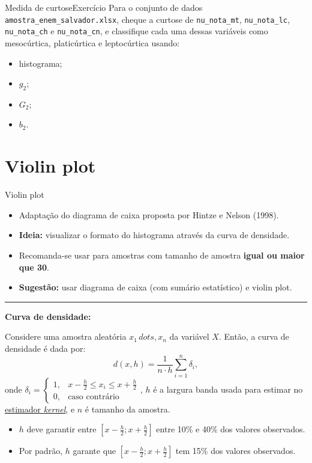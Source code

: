 \documentclass[
  10pt,
  ignorenonframetext,
]{beamer}
\providecommand{\tightlist}{%
  \setlength{\itemsep}{0pt}\setlength{\parskip}{0pt}}\usepackage{longtable,booktabs,array}
\newcommand*{\regrafina}{\rule{\textwidth}{0.5pt}}
\begin{document}
\begin{frame}[fragile]{Medida de curtose\newline Exercício}
\protect\hypertarget{medida-de-curtoseexercuxedcio}{}
Para o conjunto de dados \texttt{amostra\_enem\_salvador.xlsx}, cheque a
curtose de \texttt{nu\_nota\_mt}, \texttt{nu\_nota\_lc},
\texttt{nu\_nota\_ch} e \texttt{nu\_nota\_cn}, e classifique cada uma
dessas variáveis como mesocúrtica, platicúrtica e leptocúrtica usando:

\begin{itemize}
\tightlist
\item
  histograma;
\item
  \(g_2\);
\item
  \(G_2\);
\item
  \(b_2\).
\end{itemize}
\end{frame}

\hypertarget{violin-plot}{%
\section{Violin plot}\label{violin-plot}}

\begin{frame}{Violin plot}
\protect\hypertarget{violin-plot-1}{}
\begin{itemize}
\tightlist
\item
  Adaptação do diagrama de caixa proposta por Hintze e Nelson (1998).
\item
  \textbf{Ideia:} visualizar o formato do histograma através da curva de
  densidade.
\item
  Recomanda-se usar para amostras com tamanho de amostra \textbf{igual
  ou maior que 30}.
\item
  \textbf{Sugestão:} usar diagrama de caixa (com sumário estatístico) e
  violin plot.
\end{itemize}

\regrafina

\scriptsize

\textbf{Curva de densidade:}

Considere uma amostra aleatória \(x_1\, dots, x_n\) da variável \(X\).
Então, a curva de densidade é dada por:
\[d(x, h) = \frac{1}{n \cdot h} \sum_{i=1}^{n}\delta_i,\] onde
\(\delta_i = \begin{cases} 1, & x-\frac{h}{2} \leq x_i \leq x+\frac{h}{2}\\ 0, & \text{caso contrário} \end{cases}\),
\(h\) é a largura banda usada para estimar no
\href{https://rdrr.io/r/stats/bandwidth.html}{estimador \emph{kernel}},
e \(n\) é tamanho da amostra.

\begin{itemize}
\tightlist
\item
  \(h\) deve garantir entre
  \(\left[x - \frac{h}{2}; x + \frac{h}{2}\right]\) entre 10\% e 40\%
  dos valores observados.
\item
  Por padrão, \(h\) garante que
  \(\left[x - \frac{h}{2}; x + \frac{h}{2}\right]\) tem 15\% dos valores
  observados.
\end{itemize}

\normalsize
\end{frame}
\end{document}
